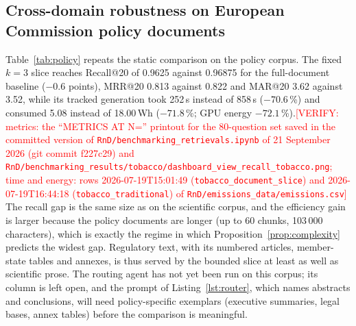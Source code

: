 \documentclass[pdflatex,sn-mathphys-num]{sn-jnl}
\makeatletter
\newcommand{\todo}[1]{\textcolor{red}{#1}}
\newcommand{\verify}[1]{\todo{[VERIFY: #1]}}
\newcommand{\Rec}[1]{Recall@#1}
\newcommand{\MRR}[1]{MRR@#1}
\newcommand{\MAR}[1]{MAR@#1}
\theoremstyle{thmstyleone}%
\theoremstyle{thmstylethree}%
\makeatother
\begin{document}
\subsection{Cross-domain robustness on European Commission policy documents}\label{sec:policy}

Table~\ref{tab:policy} repeats the static comparison on the policy corpus. The fixed $k=3$ slice reaches \Rec{20} of 0.9625 against 0.96875 for the full-document baseline ($-0.6$ points), \MRR{20} 0.813 against 0.822 and \MAR{20} 3.62 against 3.52, while its tracked generation took 252\,s instead of 858\,s ($-70.6$\,\%) and consumed 5.08 instead of 18.00\,Wh ($-71.8$\,\%; GPU energy $-72.1$\,\%).\verify{metrics: the ``METRICS AT N='' printout for the 80-question set saved in the committed version of \texttt{RnD/benchmarking\_retrievals.ipynb} of 21 September 2026 (git commit f227c29) and \texttt{RnD/benchmarking\_results/tobacco/dashboard\_view\_recall\_tobacco.png}; time and energy: rows 2026-07-19T15:01:49 (\texttt{tobacco\_document\_slice}) and 2026-07-19T16:44:18 (\texttt{tobacco\_traditional}) of \texttt{RnD/emissions\_data/emissions.csv}} The recall gap is the same size as on the scientific corpus, and the efficiency gain is larger because the policy documents are longer (up to 60 chunks, 103\,000 characters), which is exactly the regime in which Proposition~\ref{prop:complexity} predicts the widest gap. Regulatory text, with its numbered articles, member-state tables and annexes, is thus served by the bounded slice at least as well as scientific prose. The routing agent has not yet been run on this corpus; its column is left open, and the prompt of Listing~\ref{lst:router}, which names abstracts and conclusions, will need policy-specific exemplars (executive summaries, legal bases, annex tables) before the comparison is meaningful.
\end{document}
